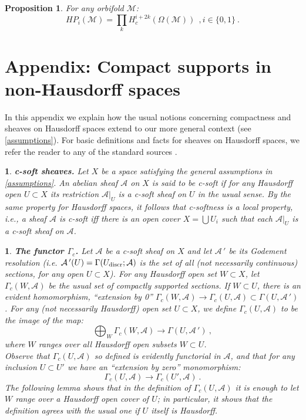 \documentclass[a4paper]{article}
\newtheorem{prop}[st]{Proposition}
\newtheorem{num}[st]{}
\newcommand{\rmap}{\longrightarrow}
\newcommand{\A}{\ensuremath{\mathcal{A}}}
\newcommand{\gc}{\ensuremath{\Gamma_c}}
\begin{document}
\begin{prop} For any orbifold $\mathcal{M}$:
\[ HP_i(\mathcal{M}) = \prod_k H_c^{i+ 2k}(\Omega(\mathcal{M})) \ \ , i\in \{0, 1\}\ .\]
\end{prop}
\section{Appendix: Compact supports in non-Hausdorff spaces}




\hspace*{.3in} In this appendix we explain how the usual notions concerning compactness and sheaves on Hausdorff spaces extend to our more general context (see \ref{assumptions}). For basic definitions and facts for sheaves on Hausdorff spaces, we refer the reader to any of the standard sources \cite{God, Iv, Borel}.


\begin{num}
\label{c-s}
\emph{
{\bf c-soft sheaves.} Let $X$ be a space satisfying the general assumptions in \ref{assumptions}. An abelian sheaf $\A$ on $X$ is said to be {\it c-soft} if for any Hausdorff open $U \subset X$ its restriction $\A|_{U}$ is a c-soft sheaf on $U$ in the usual sense. By the same property for Hausdorff spaces, it follows that c-softness is a local property, i.e., a sheaf $\A$ is c-soft iff there is an open cover $X= \bigcup U_{i}$ such that each $\A|_{U}$ is a c-soft sheaf on $\A$.
}
\end{num}



\begin{num}
\label{fgam}
\emph{
{\bf The functor \gc .} Let $\A$ be a c-soft sheaf on $X$ and let $\A\,'$ be its Godement resolution (i.e. $\A\,'(U)= \Gamma(U_{{\rm discr}}; \A)$ is the set of all (not necessarily continuous) sections, for any open $U\subset X$). For any Hausdorff open set $W\subset X$, let $\gc (W, \A)$ be the usual set of compactly supported sections. If $W\subset U$, there is an evident homomorphism, ``extension by 0'' $\gc (W, \A) \rmap \gc (U, \A)\subset \Gamma(U, \A\, ')$. For any (not necessarily Hausdorff) open set $U\subset X$, we define $\gc (U, \A)$ to be the image of the map:
\[ \bigoplus_{W}\gc(W, \A) \rmap \Gamma(U, \A\,')\ , \]
where $W$ ranges over all Hausdorff open subsets $W\subset U$.\\
\hspace*{.3in} Observe that $\gc(U, \A)$ so defined is evidently functorial in $\A$, and that for any inclusion $U\subset U '$ we have an ``extension by zero'' monomorphism:
\[ \gc(U, \A) \rmap \gc(U', \A)\ .\]
\hspace*{.3in} The following lemma shows that in the definition of $\gc(U, \A)$ it is enough to let $W$ range over a Hausdorff open cover of $U$; in particular, it shows that the definition agrees with the usual one if $U$ itself is Hausdorff.
}
\end{num}
\end{document}
